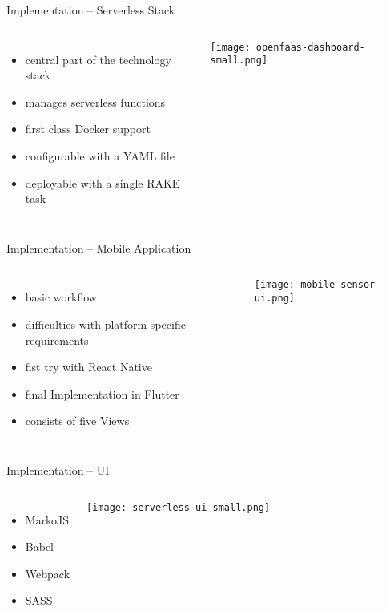 \documentclass[aspectratio=169]{beamer}
\begin{document}
  \begin{frame}{Implementation -- Serverless Stack}
    \begin{columns}
        \begin{itemize}
          \item central part of the technology stack
          \item manages serverless functions
          \item first class Docker support
          \item configurable with a YAML file
          \item deployable with a single RAKE task
        \end{itemize}
        \vfill
        \centering
        \texttt{[image: openfaas-dashboard-small.png]}
     \end{columns}
  \end{frame}

  

  \begin{frame}{Implementation -- Mobile Application}
    \begin{columns}
        \begin{itemize}
          \item basic workflow
          \item difficulties with platform specific requirements
          \item fist try with React Native
          \item final Implementation in Flutter
          \item consists of five Views
        \end{itemize}
        \vspace*{-2em}
        \centering
        \texttt{[image: mobile-sensor-ui.png]}
     \end{columns}
  \end{frame}

  

  \begin{frame}{Implementation -- UI}
    \begin{columns}
        \begin{itemize}
          \item MarkoJS
          \item Babel
          \item Webpack
          \item SASS
        \end{itemize}
        \vfill
        \centering
        \texttt{[image: serverless-ui-small.png]}
     \end{columns}
  \end{frame}
\end{document}

